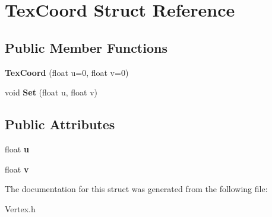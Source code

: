 \hypertarget{struct_tex_coord}{\section{Tex\+Coord Struct Reference}
\label{struct_tex_coord}
}
\subsection*{Public Member Functions}
\begin{DoxyCompactItemize}
\item 
\hypertarget{struct_tex_coord_adec9b45bb816162fe2f22a677ebfc11c}{{\bfseries Tex\+Coord} (float u=0, float v=0)}\label{struct_tex_coord_adec9b45bb816162fe2f22a677ebfc11c}

\item 
\hypertarget{struct_tex_coord_a64b4ceeb1733c478cb4b5b1216146c32}{void {\bfseries Set} (float u, float v)}\label{struct_tex_coord_a64b4ceeb1733c478cb4b5b1216146c32}

\end{DoxyCompactItemize}
\subsection*{Public Attributes}
\begin{DoxyCompactItemize}
\item 
\hypertarget{struct_tex_coord_a3be8371ac57f9ddc6ff5853e4bb58190}{float {\bfseries u}}\label{struct_tex_coord_a3be8371ac57f9ddc6ff5853e4bb58190}

\item 
\hypertarget{struct_tex_coord_ad525bc2c53d6402267c51022db33f85e}{float {\bfseries v}}\label{struct_tex_coord_ad525bc2c53d6402267c51022db33f85e}

\end{DoxyCompactItemize}


The documentation for this struct was generated from the following file\+:\begin{DoxyCompactItemize}
\item 
Vertex.\+h\end{DoxyCompactItemize}
